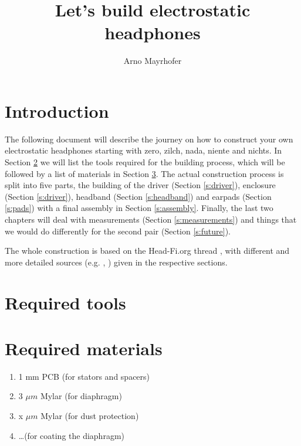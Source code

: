 \documentclass{article}
\begin{document}
\title{Let's build electrostatic headphones}
\author{Arno Mayrhofer}
\maketitle

\tableofcontents

\newpage

\section{Introduction}
\label{s:intro}
The following document will describe the journey on how to construct your own electrostatic headphones starting with zero, zilch, nada, niente and nichts. In Section \ref{s:tools} we will list the tools required for the building process, which will be followed by a list of materials in Section \ref{s:materials}. The actual construction process is split into five parts, the building of the driver (Section \ref{s:driver}), enclosure (Section \ref{s:driver}), headband (Section \ref{s:headband}) and earpads (Section \ref{s:pads}) with a final assembly in Section \ref{s:assembly}. Finally, the last two chapters will deal with measurements (Section \ref{s:measurements}) and things that we would do differently for the second pair (Section \ref{s:future}).

The whole construction is based on the Head-Fi.org thread \cite{head-fi-diy-thread}, with different and more detailed sources (e.g. \cite{electrostatic-hp-design}, \cite{tcengineering-electrostatic-drivers}) given in the respective sections.

\section{Required tools}
\label{s:tools}

\section{Required materials}
\label{s:materials}
\begin{enumerate}
    \item 1 mm PCB (for stators and spacers)
    \item 3 $\mu m$ Mylar (for diaphragm)
    \item x $\mu m$ Mylar (for dust protection) %
    \item \ldots (for coating the diaphragm) %
\end{enumerate}
\end{document}
